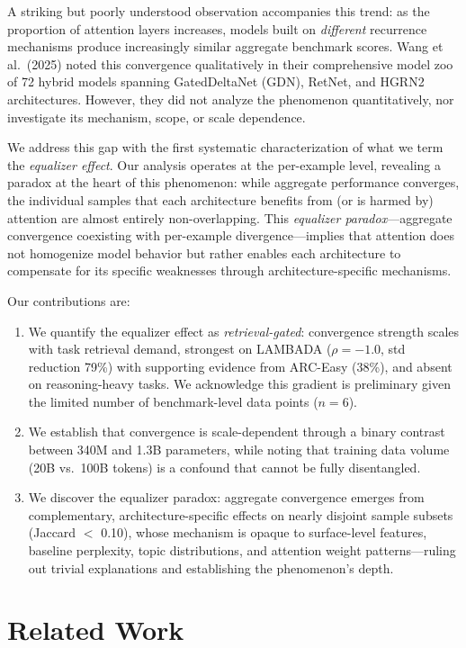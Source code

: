 \documentclass[11pt,a4paper]{article}
\begin{document}
A striking but poorly understood observation accompanies this trend: as the proportion of attention layers increases, models built on \emph{different} recurrence mechanisms produce increasingly similar aggregate benchmark scores. Wang et al.\ (2025) noted this convergence qualitatively in their comprehensive model zoo of 72 hybrid models spanning GatedDeltaNet (GDN), RetNet, and HGRN2 architectures. However, they did not analyze the phenomenon quantitatively, nor investigate its mechanism, scope, or scale dependence.

We address this gap with the first systematic characterization of what we term the \emph{equalizer effect}. Our analysis operates at the per-example level, revealing a paradox at the heart of this phenomenon: while aggregate performance converges, the individual samples that each architecture benefits from (or is harmed by) attention are almost entirely non-overlapping. This \emph{equalizer paradox}---aggregate convergence coexisting with per-example divergence---implies that attention does not homogenize model behavior but rather enables each architecture to compensate for its specific weaknesses through architecture-specific mechanisms.

Our contributions are:
\begin{enumerate}
    \item We quantify the equalizer effect as \emph{retrieval-gated}: convergence strength scales with task retrieval demand, strongest on LAMBADA ($\rho{=}{-}1.0$, std reduction 79\%) with supporting evidence from ARC-Easy (38\%), and absent on reasoning-heavy tasks. We acknowledge this gradient is preliminary given the limited number of benchmark-level data points ($n{=}6$).
    \item We establish that convergence is scale-dependent through a binary contrast between 340M and 1.3B parameters, while noting that training data volume (20B vs.\ 100B tokens) is a confound that cannot be fully disentangled.
    \item We discover the equalizer paradox: aggregate convergence emerges from complementary, architecture-specific effects on nearly disjoint sample subsets (Jaccard $<$ 0.10), whose mechanism is opaque to surface-level features, baseline perplexity, topic distributions, and attention weight patterns---ruling out trivial explanations and establishing the phenomenon's depth.
\end{enumerate}

\section{Related Work}
\end{document}
